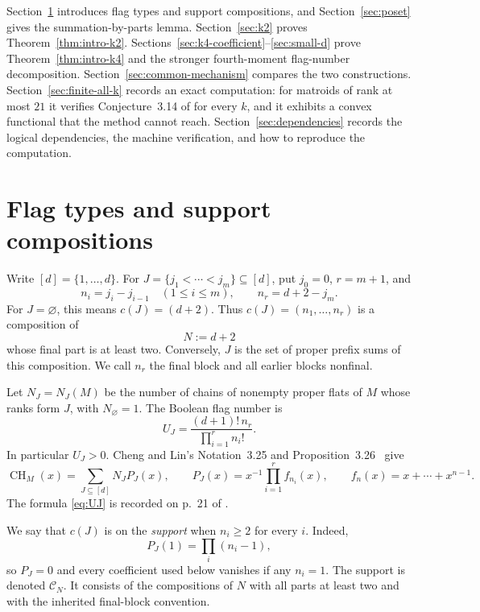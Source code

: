 \documentclass[11pt]{amsart}
\theoremstyle{definition}
\theoremstyle{remark}
\newcommand{\CH}{\operatorname{CH}}
\newcommand{\C}{\mathcal C}
\begin{document}
Section~\ref{sec:notation} introduces flag types and support compositions,
and Section~\ref{sec:poset} gives the summation-by-parts lemma.
Section~\ref{sec:k2} proves Theorem~\ref{thm:intro-k2}.
Sections~\ref{sec:k4-coefficient}--\ref{sec:small-d} prove
Theorem~\ref{thm:intro-k4} and the stronger fourth-moment flag-number
decomposition.  Section~\ref{sec:common-mechanism} compares the two
constructions.  Section~\ref{sec:finite-all-k} records an exact computation:
for matroids of rank at most $21$ it verifies Conjecture~3.14 of
\cite{ChengLin} for every $k$, and it exhibits a convex functional that the
method cannot reach.  Section~\ref{sec:dependencies} records the logical
dependencies, the machine verification, and how to reproduce the
computation.

\section{Flag types and support compositions}
\label{sec:notation}

Write $[d]=\{1,\ldots,d\}$.  For
$J=\{j_1<\cdots<j_m\}\subseteq[d]$, put $j_0=0$, $r=m+1$, and
\begin{equation}
 n_i=j_i-j_{i-1}\quad(1\le i\le m),
 \qquad n_r=d+2-j_m.
 \label{eq:composition}
\end{equation}
For $J=\varnothing$, this means $c(J)=(d+2)$.  Thus
$c(J)=(n_1,\ldots,n_r)$ is a composition of
\[
 N:=d+2
\]
whose final part is at least two.  Conversely, $J$ is the set of proper
prefix sums of this composition.  We call $n_r$ the final block and all
earlier blocks nonfinal.

Let $N_J=N_J(M)$ be the number of chains of nonempty proper flats of
$M$ whose ranks form $J$, with $N_\varnothing=1$.  The Boolean flag
number is
\begin{equation}
 U_J=\frac{(d+1)!\,n_r}{\prod_{i=1}^{r}n_i!}.
 \label{eq:UJ}
\end{equation}
In particular $U_J>0$.  Cheng and Lin's Notation~3.25 and
Proposition~3.26~\cite[p.~20]{ChengLin} give
\begin{equation}
 \CH_M(x)=\sum_{J\subseteq[d]}N_JP_J(x),\qquad
 P_J(x)=x^{-1}\prod_{i=1}^{r}f_{n_i}(x),
 \qquad f_n(x)=x+\cdots+x^{n-1}.
 \label{eq:flag-expansion}
\end{equation}
The formula \eqref{eq:UJ} is recorded on p.~21 of \cite{ChengLin}.

We say that $c(J)$ is on the \emph{support} when $n_i\ge2$ for every
$i$.  Indeed,
\begin{equation}
 P_J(1)=\prod_i(n_i-1),
 \label{eq:PJ1}
\end{equation}
so $P_J=0$ and every coefficient used below vanishes if any $n_i=1$.
The support is denoted $\C_N$.  It consists of the compositions of $N$
with all parts at least two and with the inherited final-block convention.
\end{document}
